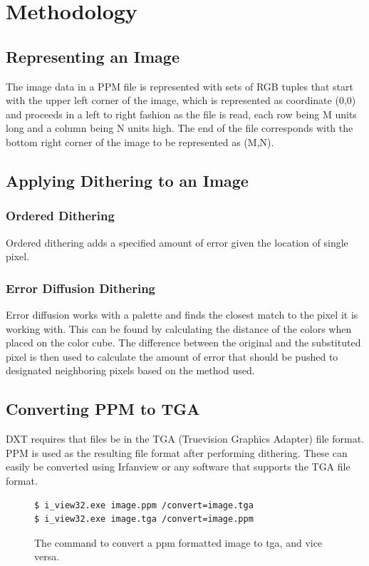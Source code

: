 \documentclass[12pt]{CPP}
\begin{document}
\newpage
\section{Methodology}
\subsection{Representing an Image}
The image data in a PPM file is represented with sets of RGB tuples that start with the upper left corner of the image, which is represented as coordinate (0,0) and proceeds in a left to right fashion as the file is read, each row being M units long and a column being N units high. The end of the file corresponds with the bottom right corner of the image to be represented as (M,N).

\subsection{Applying Dithering to an Image}
\subsubsection{Ordered Dithering}
Ordered dithering adds a specified amount of error given the location of single pixel.

\subsubsection{Error Diffusion Dithering}
Error diffusion works with a palette and finds the closest match to the pixel it is working with. This can be found by calculating the distance of the colors when placed on the color cube. The difference between the original and the substituted pixel is then used to calculate the amount of error that should be pushed to designated neighboring pixels based on the method used.

\subsection{Converting PPM to TGA}
DXT requires that files be in the TGA (Truevision Graphics Adapter) file format. PPM is used as the resulting file format after performing dithering. These can easily be converted using Irfanview or any software that supports the TGA file format.

\begin{center}
\begin{figure}[!htbp]
\begin{verbatim}
$ i_view32.exe image.ppm /convert=image.tga
$ i_view32.exe image.tga /convert=image.ppm
\end{verbatim}
\caption{The command to convert a ppm formatted image to tga, and vice versa.}
\end{figure}
\end{center}
\end{document}
